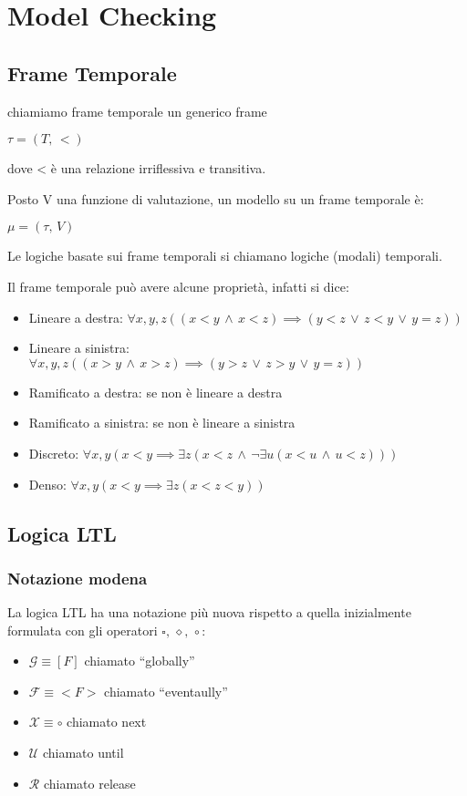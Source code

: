 
\chapter{Model Checking}


\section{Frame Temporale}

chiamiamo frame temporale un generico frame

$\tau=(T,\,<)$

dove < è una relazione irriflessiva e transitiva.

Posto V una funzione di valutazione, un modello su un frame temporale
è:

$\mu=(\tau,\, V)$

Le logiche basate sui frame temporali si chiamano logiche (modali)
temporali.

Il frame temporale può avere alcune proprietà, infatti si dice:
\begin{itemize}
\item Lineare a destra: $\forall x,y,z((x<y\,\wedge\, x<z)\implies(y<z\,\vee\, z<y\,\vee\, y=z))$ 
\item Lineare a sinistra: $\forall x,y,z((x>y\,\wedge\, x>z)\implies(y>z\,\vee\, z>y\,\vee\, y=z))$ 
\item Ramificato a destra: se non è lineare a destra
\item Ramificato a sinistra: se non è lineare a sinistra
\item Discreto: $\forall x,y(x<y\implies\exists z(x<z\,\wedge\,\neg\exists u(x<u\,\wedge\, u<z)))$
\item Denso: $\forall x,y(x<y\implies\exists z(x<z<y))$
\end{itemize}

\section{Logica LTL}


\subsection{Notazione modena}

La logica LTL ha una notazione più nuova rispetto a quella inizialmente
formulata con gli operatori $\square,\,\diamond,\,\circ$:
\begin{itemize}
\item $\mathcal{G}\equiv[F]$ chiamato ``globally''
\item $\mathcal{F}\equiv<F>$ chiamato ``eventaully''
\item $\mathcal{X}\equiv\circ$ chiamato next
\item $\mathcal{U}$ chiamato until
\item $\mathcal{R}$ chiamato release
\end{itemize}

